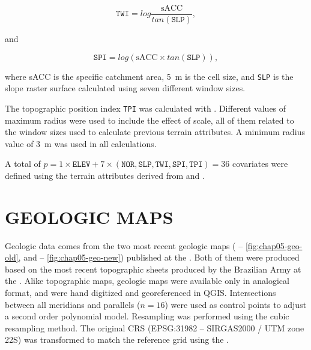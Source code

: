 \begin{equation}\label{eqn:TWI}
 \texttt{TWI} = log \dfrac{\text{sACC}}{tan(\texttt{SLP})},
\end{equation}

\noindent and

\begin{equation}\label{eqn:SPI}
 \texttt{SPI} = log(\text{sACC} \times tan(\texttt{SLP})),
\end{equation}

\noindent where sACC is the specific catchment area, \SI{5}{\m} is the cell size, and \texttt{SLP} is the 
slope raster surface calculated using seven different window sizes.

The topographic position index \texttt{TPI} was calculated with . Different values of 
maximum radius were used to include the effect of scale, all of them related to the window sizes used to 
calculate previous terrain attributes. A minimum radius value of \SI{3}{\m} was used in all calculations.

A total of $p = 1 \times \texttt{ELEV} + 7 \times (\texttt{NOR}, \texttt{SLP}, \texttt{TWI}, \texttt{SPI}, 
\texttt{TPI}) = 36$ covariates were defined using the terrain attributes derived from \demOld{} and \demNew{}.

\section{GEOLOGIC MAPS}
\label{sec:chap05-geo-maps}

Geologic data comes from the two most recent geologic maps (\geoOld{} -- \autoref{fig:chap05-geo-old}, and 
\geoNew{} -- \autoref{fig:chap05-geo-new}) published at the  \cite{GasparettoEtAl1988, 
MacielFilho1990}. Both of them were produced based on the most recent topographic sheets produced by the 
Brazilian Army at the  \cite{DSG1980, DSG1992, DSG1992a}. Alike topographic maps, 
geologic maps were available only in analogical format, and were hand digitized and georeferenced in QGIS. 
Intersections between all meridians and parallels ($n = 16$) were used as control points to adjust a second 
order polynomial model. Resampling was performed using the cubic resampling method. The original CRS 
(EPSG:31982 -- SIRGAS2000 / UTM zone 22S) was transformed to match the reference grid using the 
 \cite{BivandEtAl2013a}.

